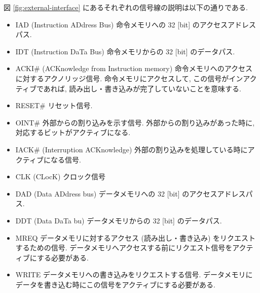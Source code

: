 \documentclass[../specifications.tex]{subfiles}
\begin{document}
  図 \ref{fig:external-interface} にあるそれぞれの信号線の説明は以下の通りである.
  \begin{itemize}
    \item IAD (Instruction ADdress Bus)
    \newline 命令メモリへの 32 [bit] のアクセスアドレスパス.

    \item IDT (Instruction DaTa Bus)
    \newline 命令メモリからの 32 [bit] のデータパス.

    \item ACKI\# (ACKnowledge from Instruction memory)
    \newline 命令メモリへのアクセスに対するアクノリッジ信号.
    命令メモリにアクセスして, この信号がインアクティブであれば, 
    読み出し・書き込みが完了していないことを意味する.
    
    \item RESET\#
    \newline リセット信号.

    \item OINT\#
    \newline 外部からの割り込みを示す信号.
    外部からの割り込みがあった時に, 対応するビットがアクティブになる.

    \item IACK\# (Interruption ACKnowledge)
    \newline 外部の割り込みを処理している時にアクティブになる信号.

    \item CLK (CLocK)
    \newline クロック信号

    \item DAD (Data ADdress bus)
    \newline データメモリへの 32 [bit] のアクセスアドレスパス.

    \item DDT (Data DaTa bu)
    \newline データメモリからの 32 [bit] のデータパス.

    \item MREQ
    \newline データメモリに対するアクセス (読み出し・書き込み) をリクエストするための信号.
    データメモリへアクセスする前にリクエスト信号をアクティブにする必要がある.

    \item WRITE
    \newline データメモリへの書き込みをリクエストする信号.
    データメモリにデータを書き込む時にこの信号をアクティブにする必要がある.


\end{itemize}
\end{document}
